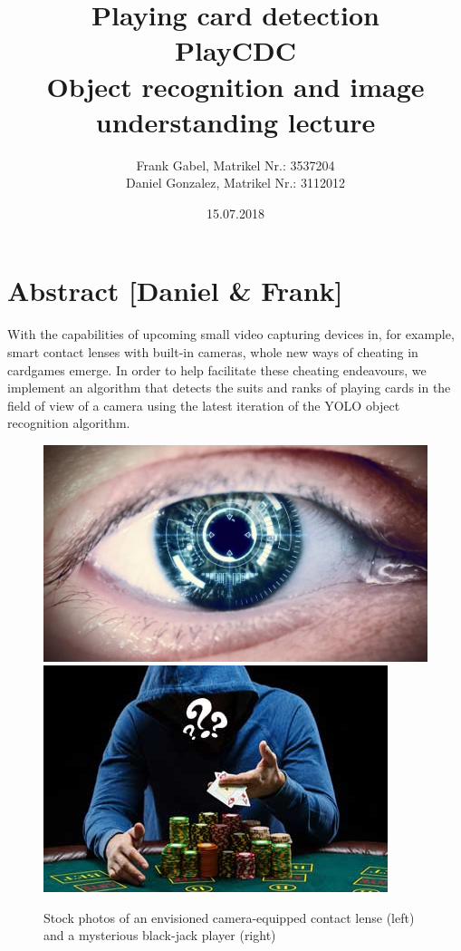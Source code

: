 \documentclass[a4paper]{article}
\title{\textbf{Playing card detection}\\ PlayCDC\\Object recognition and image understanding lecture}
\author{Frank Gabel, Matrikel Nr.: 3537204 \\ Daniel Gonzalez, Matrikel Nr.: 3112012}
\date{15.07.2018}
\begin{document}
\maketitle
\section{Abstract [Daniel \& Frank]}
With the capabilities of upcoming small video capturing devices in, for example, smart contact lenses with built-in cameras, whole new ways of cheating in cardgames emerge. In order to help facilitate these cheating endeavours, we implement an algorithm that detects the suits and ranks of playing cards in the field of view of a camera using the latest iteration of the YOLO object recognition algorithm.
\begin{figure}[h]
\includegraphics[scale=0.25]{images/contact_lense}
\includegraphics[scale=0.532]{images/poker_player}
\caption{Stock photos of an envisioned camera-equipped contact lense (left) and a mysterious black-jack player (right)}
\end{figure}
\end{document}
